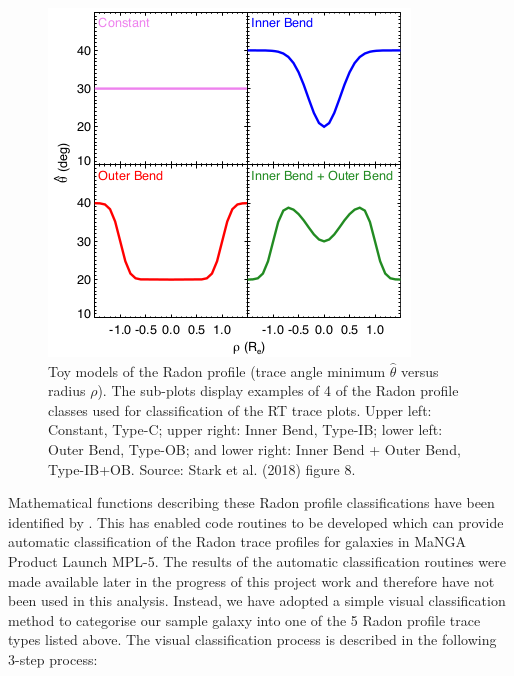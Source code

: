 \begin{figure}
    \centering
    \includegraphics[width=0.8\columnwidth]{images/RadonPlots/Radon-class-models.png}
    \caption[Radon profile class feature identification: toy models]{Toy models of the Radon profile (trace angle minimum $\hat\theta$ versus radius $\rho$). The sub-plots display examples of 4 of the Radon profile classes used for classification of the RT trace plots. Upper left: Constant, Type-C; upper right: Inner Bend, Type-IB; lower left: Outer Bend, Type-OB; and lower right: Inner Bend + Outer Bend, Type-IB+OB. Source: Stark et al. (2018) figure 8.}
    \label{fig:class-models}
\end{figure}

Mathematical functions describing these Radon profile classifications have been identified by \citet[][section 3.6]{2018MNRAS.480.2217S}. This has enabled code routines to be developed which can provide automatic classification of the Radon trace profiles for galaxies in MaNGA Product Launch MPL-5. The results of the automatic classification routines were made available later in the progress of this project work and therefore have not been used in this analysis. Instead, we have adopted a simple visual classification method to categorise our sample galaxy into one of the 5 Radon profile trace types listed above. The visual classification process is described in the following 3-step process:

